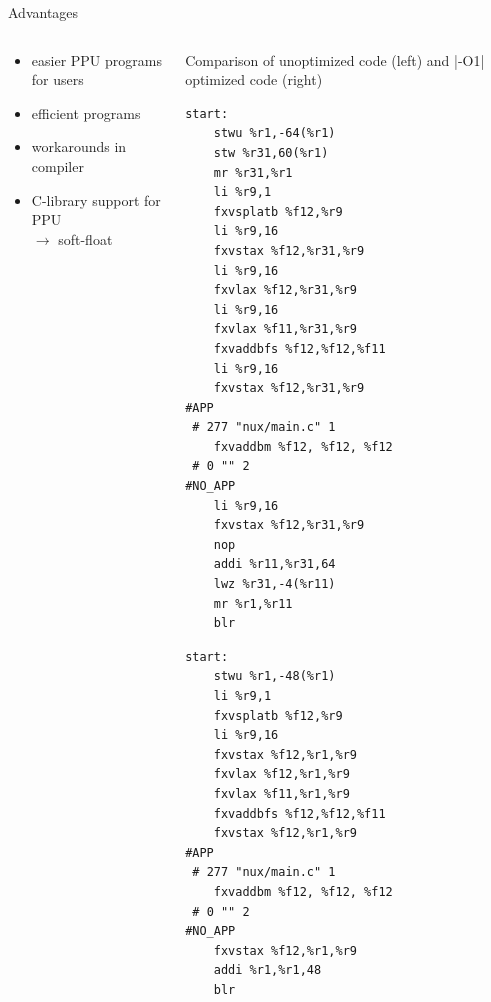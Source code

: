 \documentclass[10pt,aspectratio=169]{beamer}
\begin{document}
\begin{frame}[fragile]{Advantages}
    \begin{columns}[c]
    \begin{column}{0.4\textwidth}
		\begin{itemize}[<2->]
			\setlength\itemsep{1em}
            \item easier PPU programs for users
			\item efficient programs
			\item workarounds in compiler
			\item C-library support for PPU\\\hspace{2em} $\rightarrow$ soft-float
        \end{itemize}
    \end{column}

    \begin{column}{0.6\textwidth}
        \centering
		\scriptsize Comparison of unoptimized code (left) and |-O1| optimized code (right)
            \begin{adjustbox}{center, max width={1\columnwidth}}
			\begin{lstlisting}[basicstyle=\ttfamily\tiny\color{darkblue}]
start:
	stwu %r1,-64(%r1)
	stw %r31,60(%r1)
	mr %r31,%r1
	li %r9,1
	fxvsplatb %f12,%r9
	li %r9,16
	fxvstax %f12,%r31,%r9
	li %r9,16
	fxvlax %f12,%r31,%r9
	li %r9,16
	fxvlax %f11,%r31,%r9
	fxvaddbfs %f12,%f12,%f11
	li %r9,16
	fxvstax %f12,%r31,%r9
#APP
 # 277 "nux/main.c" 1
	fxvaddbm %f12, %f12, %f12
 # 0 "" 2
#NO_APP
	li %r9,16
	fxvstax %f12,%r31,%r9
	nop
	addi %r11,%r31,64
	lwz %r31,-4(%r11)
	mr %r1,%r11
	blr
			\end{lstlisting}
			\hspace*{2em}
			\begin{lstlisting}[basicstyle=\ttfamily\tiny\color{darkblue}]
start:
	stwu %r1,-48(%r1)
	li %r9,1
	fxvsplatb %f12,%r9
	li %r9,16
	fxvstax %f12,%r1,%r9
	fxvlax %f12,%r1,%r9
	fxvlax %f11,%r1,%r9
	fxvaddbfs %f12,%f12,%f11
	fxvstax %f12,%r1,%r9
#APP
 # 277 "nux/main.c" 1
	fxvaddbm %f12, %f12, %f12
 # 0 "" 2
#NO_APP
	fxvstax %f12,%r1,%r9
	addi %r1,%r1,48
	blr
			\end{lstlisting}
            \end{adjustbox}
    \end{column}
    \end{columns}
\end{frame}
\end{document}
